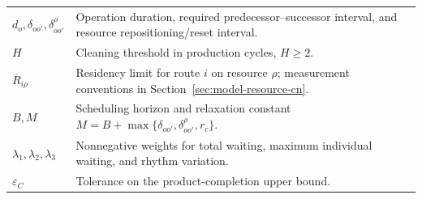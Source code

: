 \documentclass[final,5p,times,twocolumn]{elsarticle}
\begin{document}
\begin{table}[!t]
\begin{tabular}{@{}C{0.20\textwidth}C{\textwidth-8pt\relax}@{}}
$d_o,\delta_{oo'},\delta^\rho_{oo'}$ & Operation duration, required predecessor--successor interval, and resource repositioning/reset interval.\\
$H$ & Cleaning threshold in production cycles, $H\ge2$.\\
$\overline R_{i\rho}$ & Residency limit for route $i$ on resource $\rho$; measurement conventions in Section~\ref{sec:model-resource-cn}.\\
$B,M$ & Scheduling horizon and relaxation constant $M=B+\max\{\delta_{oo'},\delta^\rho_{oo'},r_c\}$.\\
$\lambda_1,\lambda_2,\lambda_3$ & Nonnegative weights for total waiting, maximum individual waiting, and rhythm variation.\\
$\varepsilon_C$ & Tolerance on the product-completion upper bound.\\
\bottomrule
\end{tabular}
\end{table}
\end{document}
